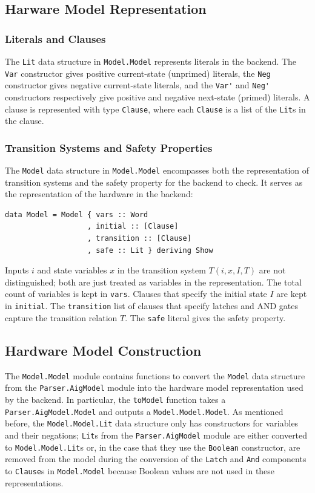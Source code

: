 \documentclass[12pt,a4paper,twoside,openright]{report}
\begin{document}
{{\subsection{Harware Model Representation}
\subsubsection{Literals and Clauses}
The \verb,Lit, data structure in \verb,Model.Model, represents literals in
the backend.
The \verb,Var, constructor gives positive current-state (unprimed) literals, the \verb,Neg,
constructor gives negative current-state literals, and the \verb,Var', and \verb,Neg', constructors
respectively give positive and negative next-state (primed) literals.
A clause is represented with type \verb,Clause,, where each \verb,Clause, is a
list of the \verb,Lit,s in the clause.

\subsubsection{Transition Systems and Safety Properties}
The \verb,Model, data structure in \verb,Model.Model, encompasses both
the representation of transition systems and the safety property for the backend to check.
It serves as the representation of the hardware in the backend:
\begin{lstlisting}
data Model = Model { vars :: Word
                   , initial :: [Clause]
                   , transition :: [Clause]
                   , safe :: Lit } deriving Show
\end{lstlisting}

Inputs $i$ and state variables $x$ in the transition system $T(i,x,I,T)$
are not distinguished; both are just treated as variables in the representation.
The total count of variables is kept in \verb,vars,.
Clauses that specify the initial state $I$ are kept in \verb,initial,.
The \verb,transition, list of clauses that specify latches and AND
gates capture the transition relation $T$.
The \verb,safe, literal gives the safety property.

\subsection{Hardware Model Construction}

The \verb,Model.Model, module contains functions to convert the \verb,Model, data
structure from the \verb,Parser.AigModel, module into the hardware model representation
used by the backend. In particular, the \verb,toModel, function takes a \verb,Parser.AigModel.Model,
and outputs a \verb,Model.Model.Model,. As mentioned before, the \verb,Model.Model.Lit,
data structure only has constructors for variables and their negations; \verb,Lit,s from
the \verb,Parser.AigModel, module are either converted to \verb,Model.Model.Lit,s or, in the case
that they use the \verb,Boolean, constructor, are removed from the model during the conversion of
the \verb,Latch, and \verb,And, components to \verb,Clause,s in \verb,Model.Model, because
Boolean values are not used in these representations.

}}
\end{document}
